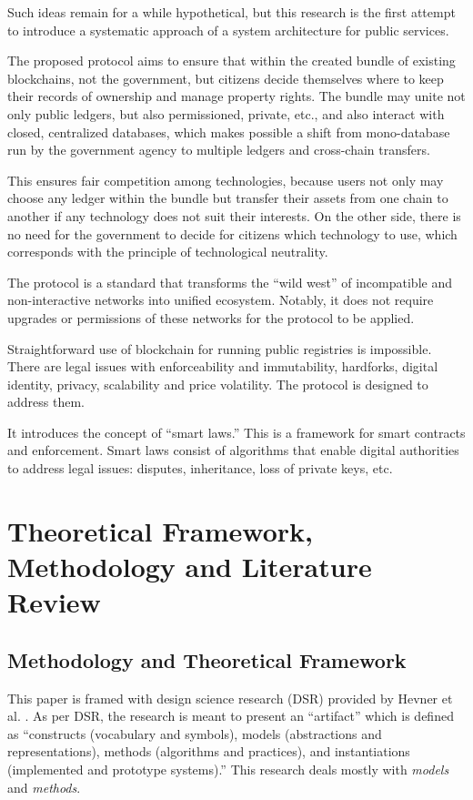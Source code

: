 \begin{multicols}{2}
Such ideas remain for a while hypothetical, but this research is the first attempt to introduce a systematic approach of a system architecture for public services.

The proposed protocol aims to ensure that within the created bundle of existing blockchains, not the government, but citizens decide themselves where to keep their records of ownership and manage property rights. The bundle may unite not only public ledgers, but also permissioned, private, etc., and also interact with closed, centralized databases, which makes possible a shift from mono-database run by the government agency to multiple ledgers and cross-chain transfers.

This ensures fair competition among technologies, because users not only may choose any ledger within the bundle but transfer their assets from one chain to another if any technology does not suit their interests. On the other side, there is no need for the government to decide for citizens which technology to use, which corresponds with the principle of technological neutrality.

The protocol is a standard that transforms the “wild west” of incompatible and non-interactive networks into unified ecosystem. Notably, it does not require upgrades or permissions of these networks for the protocol to be applied.

Straightforward use of blockchain for running public registries is impossible. There are legal issues with enforceability and immutability, hardforks, digital identity, privacy, scalability and price volatility. The protocol is designed to address them.

It introduces the concept of “smart laws.” This is a framework for smart contracts and enforcement. Smart laws consist of algorithms that enable digital authorities to address legal issues: disputes, inheritance, loss of private keys, etc.

\section{Theoretical Framework, Methodology and Literature Review}
\subsection{Methodology and Theoretical Framework}

This paper is framed with design science research (DSR) provided by Hevner et al. \cite{art1-key02}. As per DSR, the research is meant to present an “artifact” which is defined as “constructs (vocabulary and symbols), models (abstractions and representations), methods (algorithms and practices), and instantiations (implemented and prototype systems).” This research deals mostly with \textit{models} and \textit{methods}.


\end{multicols}
